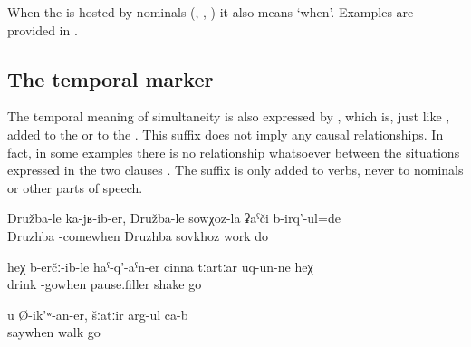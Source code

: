 When the  is hosted by nominals (, , ) it also means `when'. Examples are provided in .





\subsection{The temporal marker  }
\label{sec:enclitic =er}

The temporal meaning of simultaneity is also expressed by , which is, just like , added to the  or to the  . This suffix does not imply any causal relationships. In fact, in some examples there is no relationship whatsoever between the situations expressed in the two clauses . The suffix is only added to verbs, never to nominals or other parts of speech.
%
\begin{exe}
	\ex	\label{ex:When I moved to Druzhba, I worked in the sovkhoz in Druzhba}
	\gll	Družba-le	ka-jʁ-ib-er,	Družba-le	sowχoz-la	ʡaˁči	b-irq'-ul=de\\
		Druzhba	-comewhen	Druzhba	sovkhoz	work	do\\
	\glt	{}

	\ex	\label{ex:‎When he was drunk and went there, he staggered}
	\gll	heχ	b-erčː-ib-le	haˁ-q'-aˁn-er	cinna	tːartːar	uq-un-ne	heχ\\
			drink	-gowhen	pause.filler	shake	go	\\
	\glt	{}

	\ex	\label{ex:‎As you (masc.) say, they are walking around}
	\gll	u	Ø-ik'ʷ-an-er,	šːatːir	arg-ul	ca-b\\
			saywhen	walk	go	\\
	\glt	{}
\end{exe}


